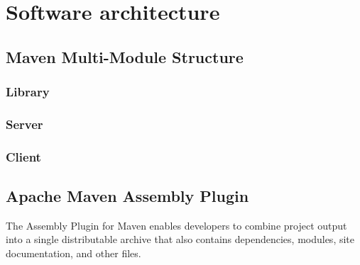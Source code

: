 \chapter{Software architecture}

\section{Maven Multi-Module Structure}
\subsection{Library}
\subsection{Server}
\subsection{Client}

\section{Apache Maven Assembly Plugin}
The Assembly Plugin for Maven enables developers to combine project output into 
a single distributable archive that also contains dependencies, modules, site 
documentation, and other files.
